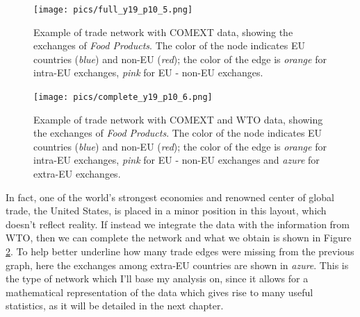 \pagebreak
\begin{figure}[H]
    \centering
    \texttt{[image: pics/full\_y19\_p10\_5.png]}
    \caption[Example of the trade network of from COMEXT data.]{Example of trade network with COMEXT data, showing the exchanges of \textit{Food Products}. The color of the node indicates EU countries (\textit{blue}) and non-EU (\textit{red}); the color of the edge is \textit{orange} for intra-EU exchanges, \textit{pink} for EU - non-EU exchanges.}
    \label{fig:gcomext}
\end{figure}
\begin{figure}[H]
    \centering
    \texttt{[image: pics/complete\_y19\_p10\_6.png]}
    \caption[Example of trade network with COMEXT and WTO data.]{Example of trade network with COMEXT and WTO data, showing the exchanges of \textit{Food Products}. The color of the node indicates EU countries (\textit{blue}) and non-EU (\textit{red}); the color of the edge is \textit{orange} for intra-EU exchanges, \textit{pink} for EU - non-EU exchanges and \textit{azure} for extra-EU exchanges.}
    \label{fig:gcomplete}
\end{figure}
In fact, one of the world's strongest economies and renowned center of global trade, the United States, is placed in a minor position in this layout, which doesn't reflect reality. If instead we integrate the data with the information from WTO, then we can complete the network and what we obtain is shown in Figure \ref{fig:gcomplete}. To help better underline how many trade edges were missing from the previous graph, here the exchanges among extra-EU countries are shown in \textit{azure}. This is the type of network which I'll base my analysis on, since it allows for a mathematical representation of the data which gives rise to many useful statistics, as it will be detailed in the next chapter.

